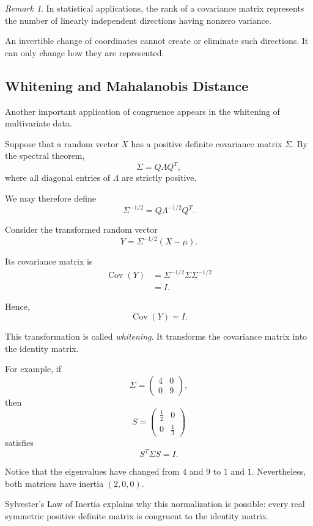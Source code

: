 \documentclass[11pt]{article}
\theoremstyle{definition}
\theoremstyle{remark}
\newtheorem{remark}[theorem]{Remark}
\begin{document}
\begin{remark}
In statistical applications, the rank of
a covariance matrix represents the number
of linearly independent directions having
nonzero variance.

An invertible change of coordinates cannot
create or eliminate such directions.
It can only change how they are represented.
\end{remark}


\subsection{Whitening and Mahalanobis Distance}

Another important application of congruence
appears in the whitening of multivariate data.

Suppose that a random vector $X$ has a
positive definite covariance matrix $\Sigma$.
By the spectral theorem,
\[
    \Sigma=Q\Lambda Q^T,
\]
where all diagonal entries of $\Lambda$
are strictly positive.

We may therefore define
\[
    \Sigma^{-1/2}
    =Q\Lambda^{-1/2}Q^T.
\]

Consider the transformed random vector
\[
    Y=\Sigma^{-1/2}(X-\mu).
\]

Its covariance matrix is
\[
\begin{aligned}
    \operatorname{Cov}(Y)
    &=\Sigma^{-1/2}\Sigma\Sigma^{-1/2}\\
    &=I.
\end{aligned}
\]

Hence,
\[
    \boxed{\operatorname{Cov}(Y)=I}.
\]

This transformation is called
\emph{whitening}. It transforms the covariance
matrix into the identity matrix.

For example, if
\[
    \Sigma=
    \begin{pmatrix}
        4&0\\
        0&9
    \end{pmatrix},
\]
then
\[
    S=
    \begin{pmatrix}
        \frac12&0\\
        0&\frac13
    \end{pmatrix}
\]
satisfies
\[
    \boxed{S^T\Sigma S=I}.
\]

Notice that the eigenvalues have changed
from $4$ and $9$ to $1$ and $1$.
Nevertheless, both matrices have inertia
$(2,0,0)$.

Sylvester's Law of Inertia explains why
this normalization is possible: every
real symmetric positive definite matrix
is congruent to the identity matrix.
\end{document}
